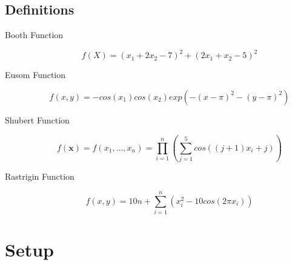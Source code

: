 \documentclass{article}
\begin{document}
\subsection{Definitions}
\label{definitions}
\begin{description}
\item[Booth Function]

\begin{equation}
f(X)=\left(x_1+2x_2-7\right)^2+\left(2x_1+x_2-5\right)^2
\end{equation}

\item[Eusom Function]

\begin{equation}
f(x,y)=−cos(x_1)cos(x_2) exp(−(x − \pi)^2−(y − \pi)^2)
\end{equation}

\item[Shubert Function]

\begin{equation}
f(\mathbf{x})=f(x_1, ...,x_n)=\prod_{i=1}^{n}{\left(\sum_{j=1}^5{ cos((j+1)x_i+j)}\right)}
\end{equation}

\item[Rastrigin Function]

\begin{equation}
f(x, y)=10n + \sum_{i=1}^{n}(x_i^2 - 10cos(2\pi x_i))
\end{equation}

\end{description} 
 

\section{Setup}
\end{document}
